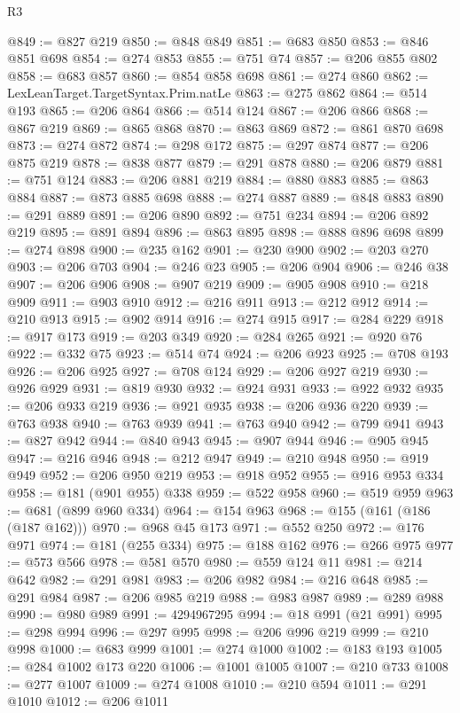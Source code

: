 \begin{lexlean}{R3}
\begin{coremodule}
@849 := @827 @219
@850 := @848 @849
@851 := @683 @850
@853 := @846 @851 @698
@854 := @274 @853
@855 := @751 @74
@857 := @206 @855 @802
@858 := @683 @857
@860 := @854 @858 @698
@861 := @274 @860
@862 := LexLeanTarget.TargetSyntax.Prim.natLe
@863 := @275 @862
@864 := @514 @193
@865 := @206 @864
@866 := @514 @124
@867 := @206 @866
@868 := @867 @219
@869 := @865 @868
@870 := @863 @869
@872 := @861 @870 @698
@873 := @274 @872
@874 := @298 @172
@875 := @297 @874
@877 := @206 @875 @219
@878 := @838 @877
@879 := @291 @878
@880 := @206 @879
@881 := @751 @124
@883 := @206 @881 @219
@884 := @880 @883
@885 := @863 @884
@887 := @873 @885 @698
@888 := @274 @887
@889 := @848 @883
@890 := @291 @889
@891 := @206 @890
@892 := @751 @234
@894 := @206 @892 @219
@895 := @891 @894
@896 := @863 @895
@898 := @888 @896 @698
@899 := @274 @898
@900 := @235 @162
@901 := @230 @900
@902 := @203 @270
@903 := @206 @703
@904 := @246 @23
@905 := @206 @904
@906 := @246 @38
@907 := @206 @906
@908 := @907 @219
@909 := @905 @908
@910 := @218 @909
@911 := @903 @910
@912 := @216 @911
@913 := @212 @912
@914 := @210 @913
@915 := @902 @914
@916 := @274 @915
@917 := @284 @229
@918 := @917 @173
@919 := @203 @349
@920 := @284 @265
@921 := @920 @76
@922 := @332 @75
@923 := @514 @74
@924 := @206 @923
@925 := @708 @193
@926 := @206 @925
@927 := @708 @124
@929 := @206 @927 @219
@930 := @926 @929
@931 := @819 @930
@932 := @924 @931
@933 := @922 @932
@935 := @206 @933 @219
@936 := @921 @935
@938 := @206 @936 @220
@939 := @763 @938
@940 := @763 @939
@941 := @763 @940
@942 := @799 @941
@943 := @827 @942
@944 := @840 @943
@945 := @907 @944
@946 := @905 @945
@947 := @216 @946
@948 := @212 @947
@949 := @210 @948
@950 := @919 @949
@952 := @206 @950 @219
@953 := @918 @952
@955 := @916 @953 @334
@958 := @181 (@901 @955) @338
@959 := @522 @958
@960 := @519 @959
@963 := @681 (@899 @960 @334)
@964 := @154 @963
@968 := @155 (@161 (@186 (@187 @162)))
@970 := @968 @45 @173
@971 := @552 @250
@972 := @176 @971
@974 := @181 (@255 @334)
@975 := @188 @162
@976 := @266 @975
@977 := @573 @566
@978 := @581 @570
@980 := @559 @124 @11
@981 := @214 @642
@982 := @291 @981
@983 := @206 @982
@984 := @216 @648
@985 := @291 @984
@987 := @206 @985 @219
@988 := @983 @987
@989 := @289 @988
@990 := @980 @989
@991 := 4294967295
@994 := @18 @991 (@21 @991)
@995 := @298 @994
@996 := @297 @995
@998 := @206 @996 @219
@999 := @210 @998
@1000 := @683 @999
@1001 := @274 @1000
@1002 := @183 @193
@1005 := @284 @1002 @173 @220
@1006 := @1001 @1005
@1007 := @210 @733
@1008 := @277 @1007
@1009 := @274 @1008
@1010 := @210 @594
@1011 := @291 @1010
@1012 := @206 @1011

\end{coremodule}
\end{lexlean}
